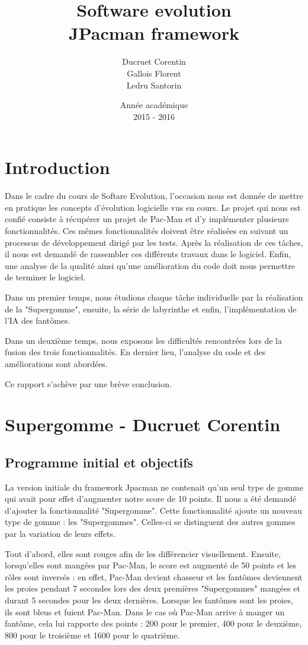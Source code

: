 \documentclass[a4paper,12pt]{report} %
\title{Software evolution \\ JPacman framework}
\author{Ducruet Corentin \\ Gallois Florent \\ Ledru Santorin}
\date{Année académique\\2015 - 2016}
\begin{document}
 
\maketitle
\newpage 
{} %
\tableofcontents
\newpage
\section{Introduction}
Dans le cadre du cours de Softare Evolution, l'occasion nous est donnée de mettre en pratique les concepts d'évolution logicielle vus en cours. Le projet qui nous est confié consiste à récupérer un projet de Pac-Man et d'y implémenter plusieurs fonctionnalités. Ces mêmes fonctionnalités doivent être réalisées en suivant un processus de développement dirigé par les tests. Après la réalisation de ces tâches, il nous est demandé de rassembler ces différents travaux dans le logiciel. Enfin, une analyse de la qualité ainsi qu'une amélioration du code doit nous permettre de terminer le logiciel.

Dans un premier temps, nous étudions chaque tâche individuelle par la réalisation de la "Supergomme", ensuite, la série de labyrinthe et enfin, l'implémentation de l'IA des fantômes.

Dans un deuxième temps, nous exposons les difficultés rencontrées lors de la fusion des trois fonctionnalités. En dernier lieu, l'analyse du code et des améliorations sont abordées.

Ce rapport s'achève par une brève conclusion.

\section{Supergomme - Ducruet Corentin}
\subsection{Programme initial et objectifs}
La version initiale du framework Jpacman ne contenait qu'un seul type de gomme qui avait pour effet d'augmenter notre score de 10 points. Il nous a été demandé d'ajouter la fonctionnalité "Supergomme". Cette fonctionnalité ajoute un nouveau type de gomme : les "Supergommes". Celles-ci se distinguent des autres gommes par la variation de leurs effets.

Tout d'abord, elles sont rouges afin de les différencier visuellement. Ensuite, lorsqu'elles sont mangées par Pac-Man, le score est augmenté de 50 points et les rôles sont inversés : en effet, Pac-Man devient chasseur et les fantômes deviennent les proies pendant 7 secondes lors des deux premières "Supergommes" mangées et durant 5 secondes pour les deux dernières. Lorsque les fantômes sont les proies, ils sont bleus et fuient Pac-Man. Dans le cas où Pac-Man arrive à manger un fantôme, cela lui rapporte des points : 200 pour le premier, 400 pour le deuxième, 800 pour le troisième et 1600 pour le quatrième.
\end{document}
